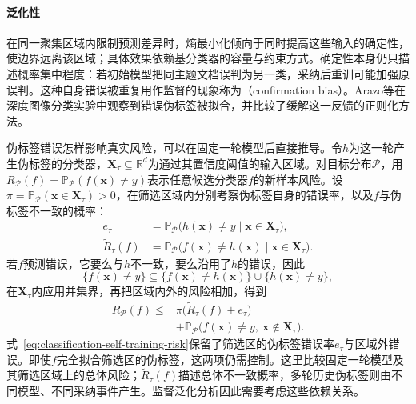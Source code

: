 \paragraph{泛化性}
在同一聚集区域内限制预测差异时，熵最小化倾向于同时提高这些输入的确定性，使边界远离该区域；具体效果依赖基分类器的容量与约束方式。确定性本身仍只描述概率集中程度：若初始模型把同主题文档误判为另一类，采纳后重训可能加强原误判。这种自身错误被重复用作监督的现象称为（confirmation bias）。Arazo等在深度图像分类实验中观察到错误伪标签被拟合，并比较了缓解这一反馈的正则化方法。

伪标签错误怎样影响真实风险，可以在固定一轮模型后直接推导。令$h$为这一轮产生伪标签的分类器，$\bm{X}_\tau\subseteq\mathbb{R}^{d}$为通过其置信度阈值的输入区域。对目标分布$\mathcal{P}$，用$R_{\mathcal{P}}(f)=\mathbb{P}_{\mathcal{P}}(f(\bm{x})\ne y)$表示任意候选分类器$f$的新样本风险。设$\pi=\mathbb{P}_{\mathcal{P}}(\bm{x}\in\bm{X}_\tau)>0$，在筛选区域内分别考察伪标签自身的错误率，以及$f$与伪标签不一致的概率：
\begin{equation}
  \label{eq:classification-self-training-conditional-risks}
  \begin{aligned}
    e_\tau
      &=\mathbb{P}_{\mathcal{P}}
        \bigl(h(\bm{x})\ne y\mid\bm{x}\in\bm{X}_\tau\bigr),\\
    \widetilde R_\tau(f)
      &=\mathbb{P}_{\mathcal{P}}
        \bigl(f(\bm{x})\ne h(\bm{x})\mid\bm{x}\in\bm{X}_\tau\bigr).
  \end{aligned}
\end{equation}
若$f$预测错误，它要么与$h$不一致，要么沿用了$h$的错误，因此
\begin{equation}
  \label{eq:classification-self-training-error-events}
  \{f(\bm{x})\ne y\}
    \subseteq
    \{f(\bm{x})\ne h(\bm{x})\}
    \cup\{h(\bm{x})\ne y\},
\end{equation}
在$\bm{X}_\tau$内应用并集界，再把区域内外的风险相加，得到
\begin{equation}
  \label{eq:classification-self-training-risk}
  \begin{aligned}
    R_{\mathcal{P}}(f)
      \leq{}&\pi\bigl(\widetilde R_\tau(f)+e_\tau\bigr)\\
      &+\mathbb{P}_{\mathcal{P}}
        \bigl(f(\bm{x})\ne y,\ \bm{x}\notin\bm{X}_\tau\bigr).
  \end{aligned}
\end{equation}
式~\eqref{eq:classification-self-training-risk}保留了筛选区的伪标签错误率$e_\tau$与区域外错误。即使$f$完全拟合筛选区的伪标签，这两项仍需控制。这里比较固定一轮模型及其筛选区域上的总体风险；$\widetilde R_\tau(f)$描述总体不一致概率，多轮历史伪标签则由不同模型、不同采纳事件产生。监督泛化分析因此需要考虑这些依赖关系。

